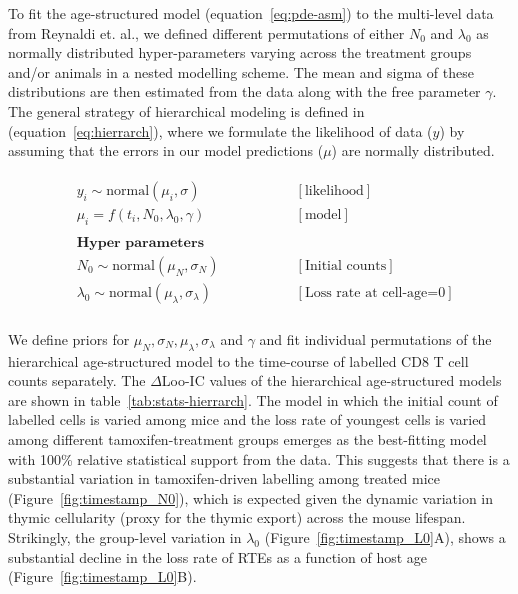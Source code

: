 \documentclass[12pt]{article} %
\begin{document}
To fit the age-structured model (equation~\ref{eq:pde-asm}) to the multi-level data from Reynaldi et. al., we defined different permutations of either $N_{0}$ and $\lambda_{0}$ as normally distributed hyper-parameters varying across the treatment groups and/or animals in a nested modelling scheme.
The mean and sigma of these distributions are then estimated from the data along with the free parameter $\gamma$.%
The general strategy of hierarchical modeling is defined in (equation~\ref{eq:hierrarch}), where we formulate the likelihood of data ($y$) by assuming that the errors in our model predictions ($\mu$) are normally distributed.

\begin{eqnarray}
\begin{aligned}
&y_i \sim \text{normal}(\mu_i, \sigma) \quad \quad \quad \quad \quad \quad  &[\text{likelihood}] \\
&\mu_i = f(t_i, N_0, \lambda_0, \gamma)  &[\text{model}]\\
\\
&\textbf{Hyper parameters} \\
&N_0 \sim \text{normal}(\mu_N, \sigma_N) \quad \quad \quad  &[\text{Initial counts}]  \\
&\lambda_0 \sim \text{normal}(\mu_{\lambda}, \sigma_{\lambda})   &[\text{Loss rate at cell-age=0}]\\
\end{aligned}
\label{eq:hierrarch}
\end{eqnarray}

We define priors for $\mu_{N}, \sigma_{N}, \mu_{\lambda}, \sigma_{\lambda}$ and $\gamma$ and fit individual permutations of the hierarchical age-structured model to the time-course of labelled CD8 T cell counts separately.
The $\Delta$Loo-IC values of the hierarchical age-structured models are shown in table~\ref{tab:stats-hierrarch}.
The model in which the initial count of labelled cells is varied among mice and the loss rate of youngest cells is varied among different tamoxifen-treatment groups emerges as the best-fitting model with 100\% relative statistical support from the data.
This suggests that there is a substantial variation in tamoxifen-driven labelling among treated mice (Figure~\ref{fig:timestamp_N0}), which is expected given the dynamic variation in thymic cellularity (proxy for the thymic export) across the mouse lifespan. 
Strikingly, the group-level variation in $\lambda_0$ (Figure~\ref{fig:timestamp_L0}A), shows a substantial decline in the loss rate of RTEs as a function of host age (Figure~\ref{fig:timestamp_L0}B).
\end{document}
